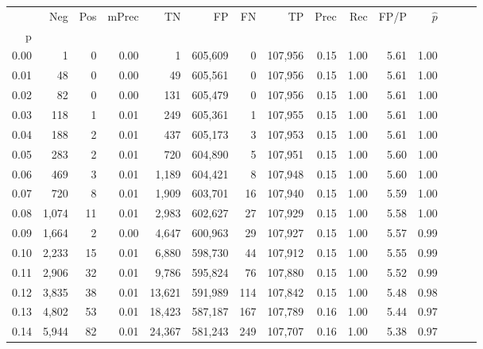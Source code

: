 \begin{tabular}{rrrrrrrrrrrrrrr}
\toprule
{} &     Neg &    Pos & mPrec &       TN &       FP &       FN &       TP &  Prec &   Rec &  FP/P & $\hat{p}$ \\
p    &         &        &       &          &          &          &          &       &       &       &           \\
\midrule
0.00 &       1 &      0 &  0.00 &        1 &  605,609 &        0 &  107,956 &  0.15 &  1.00 &  5.61 &      1.00 \\
0.01 &      48 &      0 &  0.00 &       49 &  605,561 &        0 &  107,956 &  0.15 &  1.00 &  5.61 &      1.00 \\
0.02 &      82 &      0 &  0.00 &      131 &  605,479 &        0 &  107,956 &  0.15 &  1.00 &  5.61 &      1.00 \\
0.03 &     118 &      1 &  0.01 &      249 &  605,361 &        1 &  107,955 &  0.15 &  1.00 &  5.61 &      1.00 \\
0.04 &     188 &      2 &  0.01 &      437 &  605,173 &        3 &  107,953 &  0.15 &  1.00 &  5.61 &      1.00 \\
0.05 &     283 &      2 &  0.01 &      720 &  604,890 &        5 &  107,951 &  0.15 &  1.00 &  5.60 &      1.00 \\
0.06 &     469 &      3 &  0.01 &    1,189 &  604,421 &        8 &  107,948 &  0.15 &  1.00 &  5.60 &      1.00 \\
0.07 &     720 &      8 &  0.01 &    1,909 &  603,701 &       16 &  107,940 &  0.15 &  1.00 &  5.59 &      1.00 \\
0.08 &   1,074 &     11 &  0.01 &    2,983 &  602,627 &       27 &  107,929 &  0.15 &  1.00 &  5.58 &      1.00 \\
0.09 &   1,664 &      2 &  0.00 &    4,647 &  600,963 &       29 &  107,927 &  0.15 &  1.00 &  5.57 &      0.99 \\
0.10 &   2,233 &     15 &  0.01 &    6,880 &  598,730 &       44 &  107,912 &  0.15 &  1.00 &  5.55 &      0.99 \\
0.11 &   2,906 &     32 &  0.01 &    9,786 &  595,824 &       76 &  107,880 &  0.15 &  1.00 &  5.52 &      0.99 \\
0.12 &   3,835 &     38 &  0.01 &   13,621 &  591,989 &      114 &  107,842 &  0.15 &  1.00 &  5.48 &      0.98 \\
0.13 &   4,802 &     53 &  0.01 &   18,423 &  587,187 &      167 &  107,789 &  0.16 &  1.00 &  5.44 &      0.97 \\
0.14 &   5,944 &     82 &  0.01 &   24,367 &  581,243 &      249 &  107,707 &  0.16 &  1.00 &  5.38 &      0.97 \\

\end{tabular}
